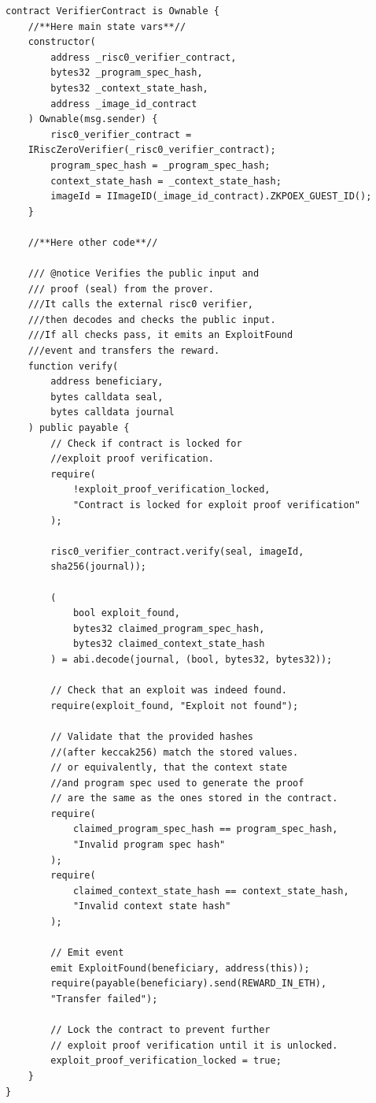 \begin{lstlisting}[caption={[VerifierContract.sol]},
                   label={lst:verifier_contract},
                   language=Solidity]
contract VerifierContract is Ownable {
    //**Here main state vars**//
    constructor(
        address _risc0_verifier_contract,
        bytes32 _program_spec_hash,
        bytes32 _context_state_hash,
        address _image_id_contract
    ) Ownable(msg.sender) {
        risc0_verifier_contract = 
    IRiscZeroVerifier(_risc0_verifier_contract);
        program_spec_hash = _program_spec_hash;
        context_state_hash = _context_state_hash;
        imageId = IImageID(_image_id_contract).ZKPOEX_GUEST_ID();
    }

    //**Here other code**//

    /// @notice Verifies the public input and 
    /// proof (seal) from the prover.
    ///It calls the external risc0 verifier, 
    ///then decodes and checks the public input.
    ///If all checks pass, it emits an ExploitFound
    ///event and transfers the reward.
    function verify(
        address beneficiary,
        bytes calldata seal,
        bytes calldata journal
    ) public payable {
        // Check if contract is locked for 
        //exploit proof verification.
        require(
            !exploit_proof_verification_locked,
            "Contract is locked for exploit proof verification"
        );
        
        risc0_verifier_contract.verify(seal, imageId, 
        sha256(journal));

        (
            bool exploit_found,
            bytes32 claimed_program_spec_hash,
            bytes32 claimed_context_state_hash
        ) = abi.decode(journal, (bool, bytes32, bytes32));

        // Check that an exploit was indeed found.
        require(exploit_found, "Exploit not found");

        // Validate that the provided hashes 
        //(after keccak256) match the stored values.
        // or equivalently, that the context state 
        //and program spec used to generate the proof
        // are the same as the ones stored in the contract.
        require(
            claimed_program_spec_hash == program_spec_hash,
            "Invalid program spec hash"
        );
        require(
            claimed_context_state_hash == context_state_hash,
            "Invalid context state hash"
        );

        // Emit event
        emit ExploitFound(beneficiary, address(this));
        require(payable(beneficiary).send(REWARD_IN_ETH), 
        "Transfer failed");

        // Lock the contract to prevent further 
        // exploit proof verification until it is unlocked.
        exploit_proof_verification_locked = true;
    }
}

\end{lstlisting}

